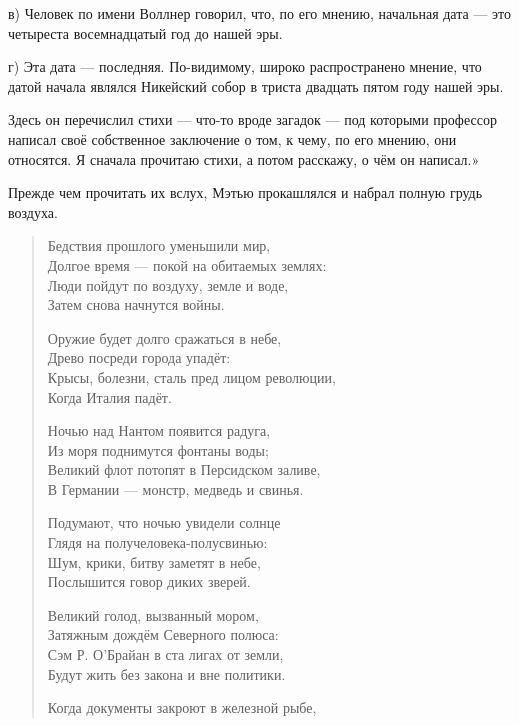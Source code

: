\documentclass[a4paper,12pt]{book}
\begin{document}
\par
в)  Человек по имени Воллнер говорил, что, по его мнению, начальная дата — это четыреста восемнадцатый год до нашей эры.
\par
г) Эта дата — последняя. По-видимому, широко распространено мнение, что датой начала являлся Никейский собор в триста двадцать пятом году нашей эры.
\par
Здесь он перечислил стихи — что-то вроде загадок — под которыми профессор написал своё собственное заключение о том, к чему, по его мнению, они относятся. Я сначала прочитаю стихи, а потом расскажу, о чём он написал.»
\par
Прежде чем прочитать их вслух, Мэтью прокашлялся и набрал полную грудь воздуха.
\begin{quote}
Бедствия прошлого уменьшили мир,\\
Долгое время — покой на обитаемых землях:\\
Люди пойдут по воздуху, земле и воде,\\
Затем снова начнутся войны.\\
\par
Оружие будет долго сражаться в небе,\\
Древо посреди города упадёт:\\
Крысы, болезни, сталь пред лицом революции,\\
Когда Италия падёт.\\
\par
Ночью над Нантом появится радуга,\\
Из моря поднимутся фонтаны воды;\\
Великий флот потопят в Персидском заливе,\\
В Германии — монстр, медведь и свинья.\\
\par
Подумают, что ночью увидели солнце\\
Глядя на получеловека-полусвинью:\\
Шум, крики, битву заметят в небе,\\
Послышится говор диких зверей.\\
\par
Великий голод, вызванный мором,\\
Затяжным дождём Северного полюса:\\
Сэм Р. О’Брайан в ста лигах от земли,\\
Будут жить без закона и вне политики.\\
\par
Когда документы закроют в железной рыбе,\\

\end{quote}
\end{document}
